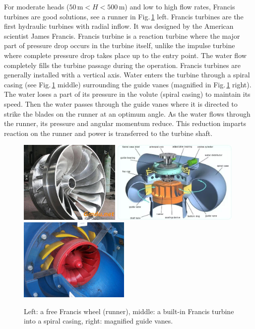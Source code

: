 For moderate heads ($50\,\mathrm{m}<H<500\,\mathrm{m}$) and low to high flow rates, Francis turbines are good solutions, see a runner in Fig.\,\ref{Fig:francis_turbine} left. Francis turbines are the first hydraulic turbines with radial inflow. It was designed by the American scientist James Francis. Francis turbine is a reaction turbine where the major part of pressure drop occurs in the turbine itself, unlike the impulse turbine where complete pressure drop takes place up to the entry point. The water flow completely fills the turbine passage during the operation. Francis turbines are generally installed with a vertical axis. Water enters the turbine through a spiral casing (see Fig.\,\ref{Fig:francis_turbine} middle) surrounding the guide vanes (magnified in Fig.\,\ref{Fig:francis_turbine} right). The water loses a part of its pressure in the volute (spiral casing) to maintain its speed. Then the water passes through the guide vanes where it is directed to strike the blades on the runner at an optimum angle. As the water flows through the runner, its pressure and angular momentum reduce. This reduction imparts reaction on the runner and power is transferred to the turbine shaft.

\begin{figure}[ht!]
	\centering
		\includegraphics[height=4cm]{HydroAndWindPower/Figures/Francis_Turbine_1.jpg}
		\includegraphics[height=4cm]{HydroAndWindPower/Figures/Francis_Turbine_2.jpg}
		\includegraphics[height=4cm]{HydroAndWindPower/Figures/Francis_Turbine_3.jpg}
	\caption{Left: a free Francis wheel (runner), middle: a built-in Francis turbine into a spiral casing, right: magnified guide vanes.}
	\label{Fig:francis_turbine}
\end{figure}

